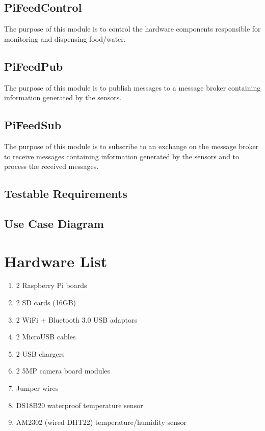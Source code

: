 \subsection{PiFeedControl}
The purpose of this module is to control the hardware components responsible
for monitoring and dispensing food/water.

\subsection{PiFeedPub}
The purpose of this module is to publish messages to a message broker containing
information generated by the sensors.

\subsection{PiFeedSub}
The purpose of this module is to subscribe to an exchange on the message broker
to receive messages containing information generated by the sensors and to
process the received messages.

\subsection{Testable Requirements}
\subsection{Use Case Diagram}

\section{Hardware List}
\begin{enumerate}

    \item 2 Raspberry Pi boards

    \item 2 SD cards (16GB)

    \item 2 WiFi + Bluetooth 3.0 USB adaptors

    \item 2 MicroUSB cables

    \item 2 USB chargers

    \item 2 5MP camera board modules

    \item Jumper wires

    \item DS18B20 waterproof temperature sensor

    \item AM2302 (wired DHT22) temperature/humidity sensor

\end{enumerate}

